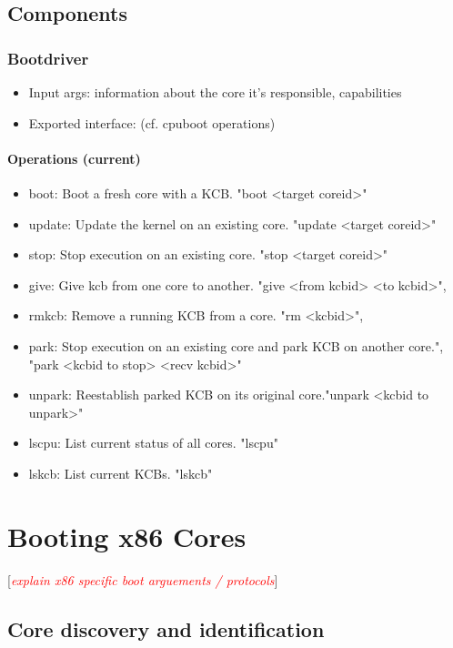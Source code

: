 \documentclass[a4paper,11pt,twoside]{report}
\newcommand{\todo}[1]{[\textcolor{red}{\emph{#1}}]}
\begin{document}
{{\section{Components}

\subsection{Bootdriver}
\begin{itemize}
    \item Input args: information about the core it's responsible, capabilities
    \item Exported interface: (cf. cpuboot operations)
\end{itemize}


\subsubsection{Operations (current)}
\begin{itemize}
\item boot: Boot a fresh core with a KCB. "boot <target coreid>"
\item update: Update the kernel on an existing core. "update <target coreid>"
\item stop: Stop execution on an existing core. "stop <target coreid>"
\item give: Give kcb from one core to another. "give <from kcbid> <to kcbid>",
\item rmkcb: Remove a running KCB from a core. "rm <kcbid>",
\item park: Stop execution on an existing core and park KCB on another core.",
    "park <kcbid to stop> <recv kcbid>"
\item unpark: Reestablish parked KCB on its original core."unpark <kcbid to 
unpark>"
\item lscpu: List current status of all cores. "lscpu"
\item lskcb: List current KCBs. "lskcb"
\end{itemize}





\chapter{Booting x86 Cores}
\label{chap:x86}
\todo{explain x86 specific boot arguements / protocols}

\section{Core discovery and identification}

}}
\end{document}
